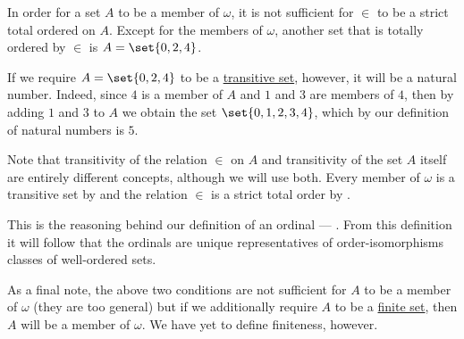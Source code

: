 \begin{remark}
  In order for a set \( A \) to be a member of \( \omega \), it is not sufficient for \( \in \) to be a strict total ordered on \( A \). Except for the members of \( \omega \), another set that is totally ordered by \( \in \) is \( A = \set{ 0, 2, 4 } \).

  If we require \( A = \set{ 0, 2, 4 } \) to be a \hyperref[def:transitive_set]{transitive set}, however, it will be a natural number. Indeed, since \( 4 \) is a member of \( A \) and \( 1 \) and \( 3 \) are members of \( 4 \), then by adding \( 1 \) and \( 3 \) to \( A \) we obtain the set \( \set{ 0, 1, 2, 3, 4 } \), which by our definition of natural numbers is \( 5 \).

  Note that transitivity of the relation \( \in \) on \( A \) and transitivity of the set \( A \) itself are entirely different concepts, although we will use both. Every member of \( \omega \) is a transitive set by  and the relation \( \in \) is a strict total order by .

  This is the reasoning behind our definition of an ordinal --- . From this definition it will follow that the ordinals are unique representatives of order-isomorphisms classes of well-ordered sets.

  As a final note, the above two conditions are not sufficient for \( A \) to be a member of \( \omega \) (they are too general) but if we additionally require \( A \) to be a \hyperref[def:infinite_set]{finite set}, then \( A \) will be a member of \( \omega \). We have yet to define finiteness, however.
\end{remark}

